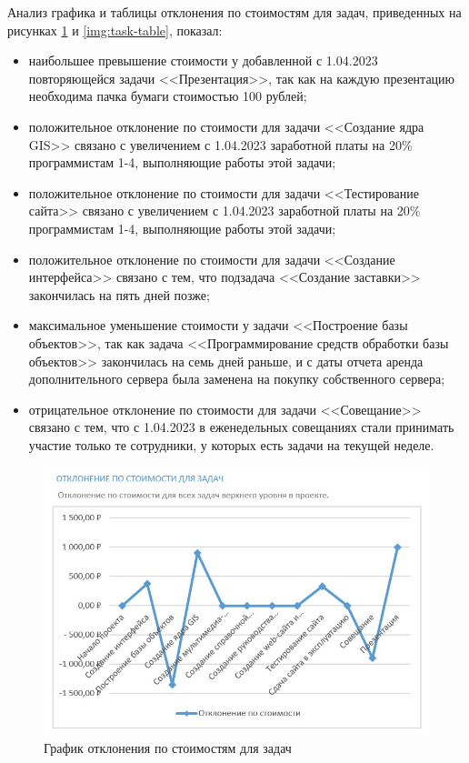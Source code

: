 Анализ графика и таблицы отклонения по стоимостям для задач, приведенных на рисунках \ref{img:task-graph} и \ref{img:task-table}, показал:

\begin{itemize}
	\item наибольшее превышение стоимости у добавленной с 1.04.2023 повторяющейся задачи <<Презентация>>, так как на каждую презентацию необходима пачка бумаги стоимостью 100 рублей;
	\item положительное отклонение по стоимости для задачи <<Создание ядра GIS>> связано с увеличением с 1.04.2023 заработной платы на 20\% программистам 1-4, выполняющие работы этой задачи;
	\item положительное отклонение по стоимости для задачи <<Тестирование сайта>> связано с увеличением с 1.04.2023 заработной платы на 20\% программистам 1-4, выполняющие работы этой задачи;
	\item положительное отклонение по стоимости для задачи <<Создание интерфейса>> связано с тем, что подзадача <<Создание заставки>> закончилась на пять дней позже;
	\item максимальное уменьшение стоимости у задачи <<Построение базы объектов>>, так как задача <<Программирование средств обработки базы объектов>> закончилась на семь дней раньше, и с даты отчета аренда дополнительного сервера была заменена на покупку собственного сервера;
	\item отрицательное отклонение по стоимости для задачи <<Совещание>> связано с тем, что с 1.04.2023 в еженедельных совещаниях стали принимать участие только те сотрудники, у которых есть задачи на текущей неделе.
\end{itemize}

\begin{figure}[H]
	\begin{center}
		\includegraphics[scale=0.5]{inc/img/task-graph.jpg}
	\end{center}
	\captionsetup{justification=centering}
	\caption{График отклонения по стоимостям для задач}
	\label{img:task-graph}
\end{figure}

